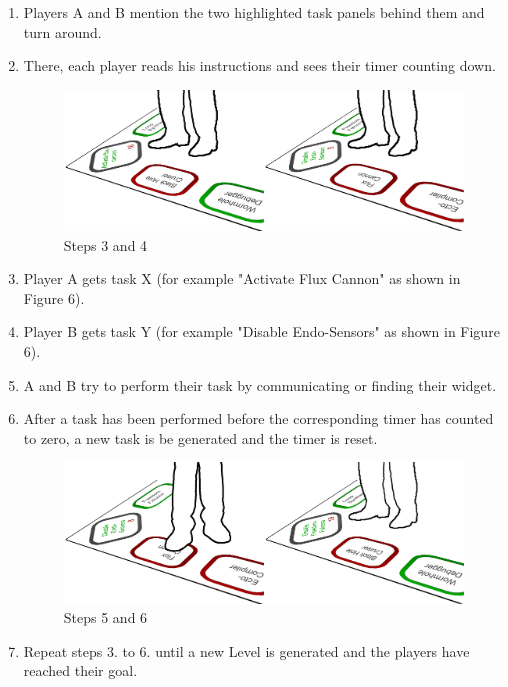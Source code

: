 \documentclass{sigchi}
\begin{document}
\begin{enumerate}
\item Players A and B mention the two highlighted task panels behind them and turn around.
\item There, each player reads his instructions and sees their timer counting down.


\begin{figure}[H]
\centering
\includegraphics[width=0.99\columnwidth]{walkthrough/klein/gamingarea3+4}
\caption{Steps 3 and 4}
\label{fig:gamingArea}
\end{figure}

\item Player A gets task X (for example "Activate Flux Cannon" as shown in Figure 6).
\item Player B gets task Y (for example "Disable Endo-Sensors" as shown in Figure 6).
\item A and B try to perform their task by communicating or finding their widget.
\item After a task has been performed before the corresponding timer has counted to zero, a new task is be generated and the timer is reset.

\begin{figure}[H]
\centering
\includegraphics[width=0.99\columnwidth]{walkthrough/klein/gamingarea5+6}
\caption{Steps 5 and 6}
\label{fig:gamingArea}
\end{figure}
\item Repeat steps 3. to 6. until a new Level is generated and the players have reached their goal.
\end{enumerate}
\end{document}
